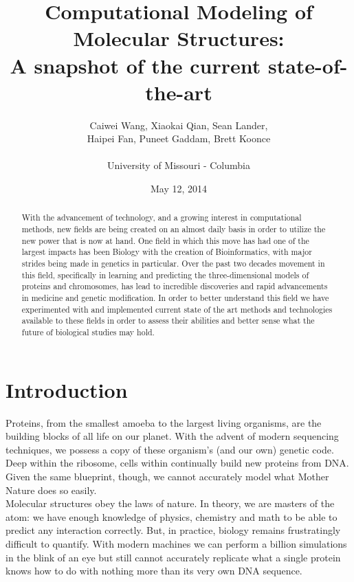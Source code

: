 \documentclass{article}
\title{Computational Modeling of Molecular Structures:\\A snapshot of the current state-of-the-art}
\author{Caiwei Wang, Xiaokai Qian, Sean Lander, \\Haipei Fan, Puneet Gaddam, Brett Koonce\\\\University of Missouri - Columbia}
\date{May 12, 2014}
\begin{document}
\maketitle

\begin{abstract}

With the advancement of technology, and a growing interest in computational methods, new fields are being created on an almost daily basis in order to utilize the new power that is now at hand. One field in which this move has had one of the largest impacts has been Biology with the creation of Bioinformatics, with major strides being made in genetics in particular. Over the past two decades movement in this field, specifically in learning and predicting the three-dimensional models of proteins and chromosomes, has lead to incredible discoveries and rapid advancements in medicine and genetic modification. In order to better understand this field we have experimented with and implemented current state of the art methods and technologies available to these fields in order to assess their abilities and better sense what the future of biological studies may hold.

\end{abstract}

\section{Introduction}

Proteins, from the smallest amoeba to the largest living organisms, are the building blocks of all life on our planet.  With the advent of modern sequencing techniques, we possess a copy of these organism's (and our own) genetic code.  Deep within the ribosome, cells within continually build new proteins from DNA.  Given the same blueprint, though, we cannot accurately model what Mother Nature does so easily.\\

Molecular structures obey the laws of nature.  In theory, we are masters of the atom: we have enough knowledge of physics, chemistry and math to be able to predict any interaction correctly.  But, in practice, biology remains frustratingly difficult to quantify.  With modern machines we can perform a billion simulations in the blink of an eye but still cannot accurately replicate what a single protein knows how to do with nothing more than its very own DNA sequence.\\
\end{document}
